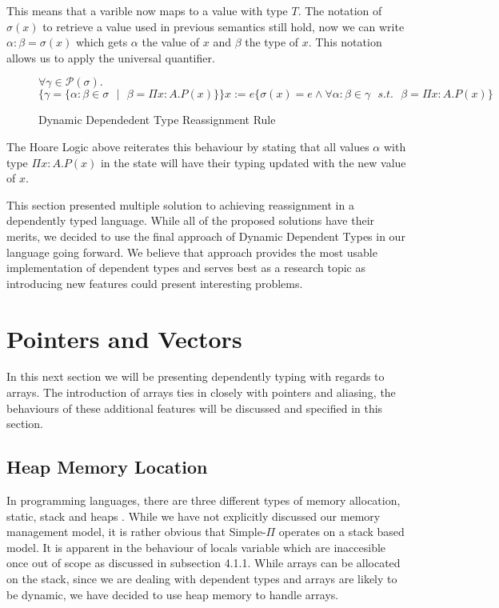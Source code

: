\documentclass[a4paper,12pt]{report}
\begin{document}
This means that a varible now maps to a value with type $T$. The notation of 
$\sigma(x)$ to retrieve a value used in previous semantics still hold, now we 
can write $\alpha : \beta = \sigma(x)$ which gets $\alpha$ the value of $x$ 
and $\beta$ the type of $x$. This notation allows us to apply the universal 
quantifier.

\begin{figure}[H]
  \begin{center}
    $\forall \gamma \in \mathcal{P}(\sigma).$\\
    \footnotesize$\{\gamma = \{\alpha : \beta \in \sigma\text{ }|\text{ }\beta = 
    \Pi x : A. P(x)\}\}x:= e\{\sigma(x) = e \wedge 
    \forall \alpha : \beta \in \gamma\text{ }s.t.\text{ }\beta = \Pi x : A. P(x)\}$ 
    \normalsize
  \end{center}
  \caption{Dynamic Dependedent Type Reassignment Rule}
\end{figure}


\par
The Hoare Logic above reiterates this behaviour by stating that all values $\alpha$ with 
type $\Pi x : A.P(x)$ in the state will have their typing updated with the new value 
of $x$.

This section presented multiple solution to achieving reassignment in a 
dependently typed language. While all of the proposed solutions have their 
merits, we decided to use the final approach of Dynamic Dependent Types in our 
language going forward. We believe that approach provides the most usable 
implementation of dependent types and serves best as a research topic as 
introducing new features could present interesting problems. 

\section{Pointers and Vectors}
In this next section we will be presenting dependently typing with regards to 
arrays. The introduction of arrays ties in closely with pointers and aliasing, 
the behaviours of these additional features will be discussed and specified in this 
section.

\subsection{Heap Memory Location}
In programming languages, there are three different types of memory allocation, 
static, stack and heaps \cite{heapVsStack}. While we have not explicitly 
discussed our memory management model, it is rather obvious that Simple-$\Pi$ 
operates on a stack based model. It is apparent in the behaviour of locals 
variable which are inaccesible once out of scope as discussed in subsection 
4.1.1. While arrays can be allocated on the stack, since we are dealing 
with dependent types and arrays are likely to be dynamic, we have decided to use heap 
memory to handle arrays. 
\end{document}
